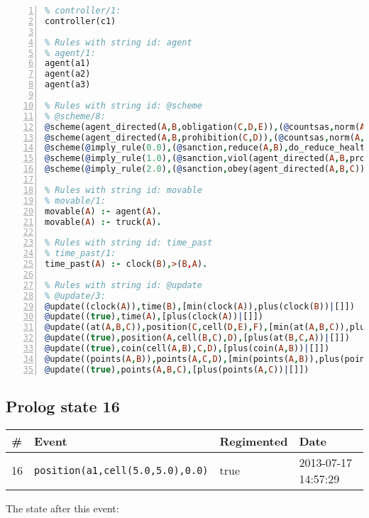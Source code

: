 \documentclass[11pt]{article}\usepackage[utf8]{inputenc}\usepackage{geometry}
\begin{document}
\begin{lstlisting}[language=Prolog, numbers=left]
% Rules with string id: controller
% controller/1:
controller(c1)

% Rules with string id: agent
% agent/1:
agent(a1)
agent(a2)
agent(a3)

% Rules with string id: @scheme
% @scheme/8:
@scheme(agent_directed(A,B,obligation(C,D,E)),(@countsas,norm(A,B,F,obligation(C,D,E)),F),false,(listTrue(C)),(time_past(D)),false,[plus(viol(agent_directed(A,B,obligation(C,D,E))))|[]],[plus(obey(agent_directed(A,B,obligation(C,D,E))))|[]])
@scheme(agent_directed(A,B,prohibition(C,D)),(@countsas,norm(A,B,E,prohibition(C,D)),E),(listTrue(C)),false,(false),false,[plus(viol(agent_directed(A,B,prohibition(C,D))))|[]],[plus(obey(agent_directed(A,B,prohibition(C,D))))|[]])
@scheme(@imply_rule(0.0),(@sanction,reduce(A,B),do_reduce_health(A,B),notifyAgent(A,changed(status))),true,false,false,false,[min(reduce(A,B))|[]],[])
@scheme(@imply_rule(1.0),(@sanction,viol(agent_directed(A,B,prohibition(C,D))),do_sanction(D)),true,false,false,false,[min(viol(agent_directed(A,B,prohibition(C,D))))|[]],[])
@scheme(@imply_rule(2.0),(@sanction,obey(agent_directed(A,B,C))),true,false,false,false,[min(obey(agent_directed(A,B,C)))|[]],[])

% Rules with string id: movable
% movable/1:
movable(A) :- agent(A).
movable(A) :- truck(A).

% Rules with string id: time_past
% time_past/1:
time_past(A) :- clock(B),>(B,A).

% Rules with string id: @update
% @update/3:
@update((clock(A)),time(B),[min(clock(A)),plus(clock(B))|[]])
@update((true),time(A),[plus(clock(A))|[]])
@update((at(A,B,C)),position(C,cell(D,E),F),[min(at(A,B,C)),plus(at(D,E,C))|[]])
@update((true),position(A,cell(B,C),D),[plus(at(B,C,A))|[]])
@update((true),coin(cell(A,B),C,D),[plus(coin(A,B))|[]])
@update((points(A,B)),points(A,C,D),[min(points(A,B)),plus(points(A,D))|[]])
@update((true),points(A,B,C),[plus(points(A,C))|[]])

\end{lstlisting}
\clearpage 
\subsection{Prolog state 16}
\begin{table}[ht]
\centering 
\begin{tabular}{l l l l} 
\textbf{\#} & \textbf{Event} & \textbf{Regimented} & \textbf{Date} \\ [0.5ex] 
\hline
16&\texttt{position(a1,cell(5.0,5.0),0.0)}&true&2013-07-17 14:57:29\\ [1ex] \hline\end{tabular}
\end{table}
The state after this event:
\end{document}
